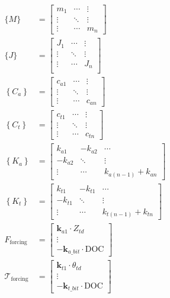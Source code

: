 \begin{align}
	\{M\} &= \left[\begin{array}{ccc}
				m_1 & \cdots & \vdots \\
				\vdots & \ddots & \vdots \\
				\vdots & \cdots & m_n
				\end{array}\right] \\
	\{J\} &= \left[\begin{array}{ccc}
			J_1 & \cdots & \vdots \\
			\vdots & \ddots & \vdots \\
			\vdots & \cdots & J_n  \\
  			\end{array}\right] \\
	\left\{C_a\right\} &= \left[\begin{array}{ccc}
							c_{a 1} & \cdots & \vdots \\
							\vdots & \ddots & \vdots \\
							\vdots & \cdots & c_{a n}
							\end{array}\right] \\
	\left\{C_t\right\} &= \left[\begin{array}{ccc}
							c_{t 1} & \cdots & \vdots \\
							\vdots & \ddots & \vdots \\
							\vdots & \cdots & c_{t n}
							\end{array}\right] \\
 	\left\{K_a\right\} &= \left[\begin{array}{ccc}
							k_{a 1} & -k_{a 2} & \cdots \\
							-k_{a 2} & \ddots & \vdots \\
							\vdots & \cdots & k_{a(n-1)}+k_{a n}
							\end{array}\right] \\
	\left\{K_t\right\} &= \left[\begin{array}{ccc}
							k_{t 1} & -k_{t 1} & \cdots \\
							-k_{t 1} & \ddots & \vdots \\
							\vdots & \cdots & k_{t(n-1)}+k_{t n}
							\end{array}\right] \\
  	F_{\text{forcing}} &= \left[\begin{array}{c}
							\boldsymbol{k}_{a 1} \cdot Z_{td} \\
							\vdots \\
							-\boldsymbol{k}_{a\_bit} \cdot \text{DOC}
							\end{array}\right] \\
	\mathcal{T}_{\text{forcing}} &= \left[\begin{array}{c}
							\boldsymbol{k}_{t 1} \cdot \theta_{td} \\
							\vdots \\
							-\boldsymbol{k}_{t\_bit} \cdot \text{DOC}
							\end{array}\right]
	\label{eq:emmatrixform}
\end{align}


